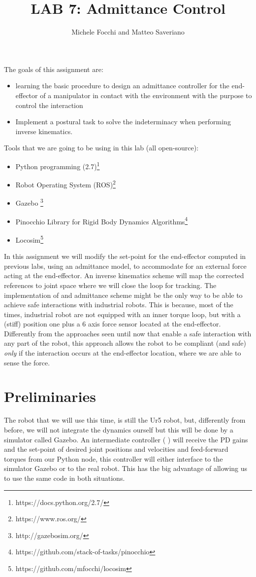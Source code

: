\documentclass[11pt]{article}
\title{LAB 7: Admittance Control}
\author{Michele Focchi and Matteo Saveriano}
\date{}
\begin{document}
	\maketitle
	\noindent
	The goals of this assignment are:
	\begin{itemize}
		\item learning the basic procedure to design an admittance controller for the end-effector of a manipulator in contact with the environment with the purpose to control the interaction
		\item Implement a postural task to solve the indeterminacy when performing inverse kinematics. 
	\end{itemize}
	
	\noindent
	Tools that we are going to be using in this lab (all open-source):
	\begin{itemize}
		\item Python programming (2.7)\footnote{https://docs.python.org/2.7/}
		\item Robot Operating System (ROS)\footnote{https://www.ros.org/}
		\item Gazebo \footnote{http://gazebosim.org/}
		\item Pinocchio Library for Rigid Body Dynamics Algorithms\footnote{https://github.com/stack-of-tasks/pinocchio}
		\item Locosim\footnote{https://github.com/mfocchi/locosim}
	\end{itemize}
	In this assignment we will modify the set-point for the end-effector computed in previous labs, using an admittance model, to accommodate for an external force acting at the end-effector. An inverse kinematics scheme will map the corrected references to joint space where we will close the loop for tracking. The implementation of and admittance scheme might be the only way to be able to  achieve safe interactions with industrial robots. This is because, most of the times, industrial robot are not equipped with an inner torque loop, but with a (stiff) position one plus a 6 axis force sensor located at the end-effector. Differently from the approaches seen until now that enable a safe interaction with any part of the robot, this approach allows  
	the robot to be compliant (and safe) \textit{only} if the interaction occurs at the end-effector location, where we are able to 
	sense the force. 
	
\section{Preliminaries}
	The robot that we will use this time, is still the  Ur5 robot, but, differently from before, we will not integrate the dynamics ourself but this will be done by a simulator called Gazebo. An intermediate controller ( ) will receive the PD gains and the set-point of desired joint positions and velocities and feed-forward torques from our Python node, this controller will either interface to the simulator Gazebo or to the real robot. This has the big advantage of  allowing us to use the same code in both situations.\\
\end{document}
